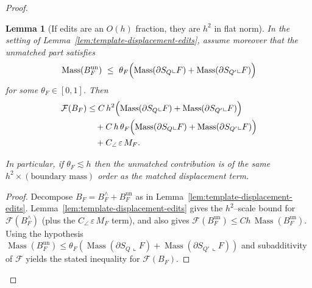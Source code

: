 \documentclass[11pt]{article}
\numberwithin{equation}{section}  %
\theoremstyle{plain}
\newtheorem{lemma}[theorem]{Lemma}
\theoremstyle{definition}
\theoremstyle{remark}
\DeclareMathOperator{\Mass}{Mass}
\begin{document}
\begin{proof}
\begin{lemma}[If edits are an $O(h)$ fraction, they are $h^2$ in flat norm]\label{lem:template-edits-oh}
In the setting of Lemma~\ref{lem:template-displacement-edits}, assume moreover that the unmatched part satisfies
\[
\Mass(B_F^{\mathrm{un}})\ \le\ \theta_F\Bigl(\Mass(\partial S_Q\llcorner F)+\Mass(\partial S_{Q'}\llcorner F)\Bigr)
\]
for some $\theta_F\in[0,1]$.
Then
\[
\begin{aligned}
	\mathcal F(B_F)
	&\le C\,h^2\Bigl(\Mass(\partial S_Q\llcorner F)+\Mass(\partial S_{Q'}\llcorner F)\Bigr) \\
	&\quad + C\,h\,\theta_F\Bigl(\Mass(\partial S_Q\llcorner F)+\Mass(\partial S_{Q'}\llcorner F)\Bigr) \\
	&\quad + C_{\angle}\,\varepsilon\,M_F.
\end{aligned}
\]

In particular, if $\theta_F\lesssim h$ then the unmatched contribution is of the same $h^2\times(\text{boundary mass})$ order as the matched displacement term.
\end{lemma}


\begin{proof}
Decompose $B_F=B_F^{\wedge}+B_F^{\mathrm{un}}$ as in Lemma~\ref{lem:template-displacement-edits}.
Lemma~\ref{lem:template-displacement-edits} gives the $h^2$--scale bound for $\mathcal F(B_F^{\wedge})$ (plus the $C_{\angle}\,\varepsilon\,M_F$ term), and also gives
\(
\mathcal F(B_F^{\mathrm{un}})\le C h\,\Mass(B_F^{\mathrm{un}}).
\)
Using the hypothesis $\Mass(B_F^{\mathrm{un}})\le \theta_F(\Mass(\partial S_Q\llcorner F)+\Mass(\partial S_{Q'}\llcorner F))$ and subadditivity of $\mathcal F$
yields the stated inequality for $\mathcal F(B_F)$.
\end{proof}


\end{proof}
\end{document}
